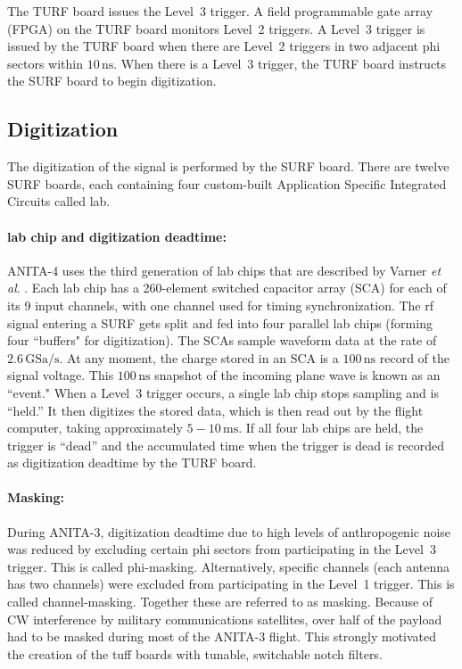 The TURF board issues the Level~3 trigger.
A field programmable gate array (FPGA) on the TURF board monitors Level~2 triggers.
A Level~3 trigger is issued by the TURF board when there are Level~2 triggers in two adjacent phi sectors within $10\,\mbox{ns}$. 
When there is a Level~3 trigger, the TURF board instructs 
the SURF board to begin digitization.

\subsection{Digitization}

The digitization of the signal is performed by the SURF board. 
There are twelve SURF boards, each containing four custom-built Application Specific Integrated
Circuits called \gls{lab}. 

\paragraph{\gls{lab} chip and digitization deadtime:}
ANITA-4 uses the third generation
of \gls{lab} chips that are described by Varner \textit{et al}. \cite{labrador}. 
Each \gls{lab} chip has a 260-element switched capacitor array (SCA) for each of its 9 input channels, with one channel used for timing synchronization.
The \gls{rf} signal entering a SURF gets split and fed into four parallel \gls{lab} chips (forming four ``buffers" for digitization). 
The SCAs sample waveform data at the rate of $2.6\,\mbox{GSa/s}$. 
At any moment, the charge stored in an SCA is a $100\,\mbox{ns}$ record of the signal voltage. 
This $100\,\mbox{ns}$ snapshot of the incoming plane wave is known as an ``event."
When a Level~3 trigger occurs, a single \gls{lab} chip stops sampling and is ``held.'' It then digitizes
the stored data, which is then read out by the flight computer, taking approximately $5-10\,\mbox{ms}$.
If all four \gls{lab} chips are held, the trigger is ``dead'' and the accumulated time when the trigger is dead is recorded as
digitization deadtime by the TURF board. 

\paragraph{Masking:}

During ANITA-3, digitization deadtime due to high levels of anthropogenic noise was reduced
by excluding
certain phi sectors from participating in the Level~3 trigger. 
This is called phi-masking. 
Alternatively, specific channels (each antenna has two channels) were excluded from participating in the Level~1 trigger. 
This is called channel-masking.
Together these are referred to as masking.
Because of CW interference by military communications
satellites, over half of the payload had to be masked
during most of the ANITA-3 flight. 
This strongly motivated the creation of the \gls{tuff}
boards with tunable, switchable notch filters. 

